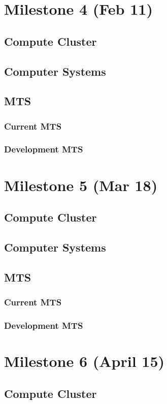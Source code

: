 \documentclass[12pt]{article}
\begin{document}
\section{Milestone 4 (Feb 11)}
\subsection{Compute Cluster}
\subsection{Computer Systems}
\subsection{MTS}
\subsubsection{Current MTS}
\subsubsection{Development MTS}
\section{Milestone 5 (Mar 18)}
\subsection{Compute Cluster}
\subsection{Computer Systems}
\subsection{MTS}
\subsubsection{Current MTS}
\subsubsection{Development MTS}
\section{Milestone 6 (April 15)}
\subsection{Compute Cluster}
\end{document}
